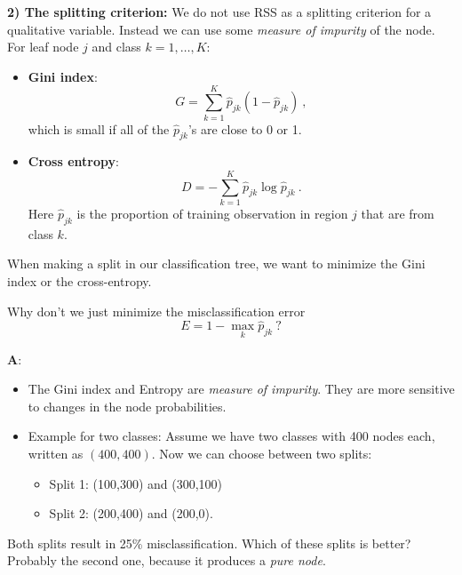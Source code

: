 \documentclass[10pt,ignorenonframetext,]{beamer}
\providecommand{\tightlist}{%
  \setlength{\itemsep}{0pt}\setlength{\parskip}{0pt}}
\begin{document}
\begin{frame}

\textbf{2) The splitting criterion:} We do not use RSS as a splitting
criterion for a qualitative variable. Instead we can use some
\emph{measure of impurity} of the node. For leaf node \(j\) and class
\(k=1,\ldots, K\):

\begin{itemize}
\tightlist
\item
  \textbf{Gini index}: \[
  G=\sum_{k=1}^K \hat{p}_{jk}(1-\hat{p}_{jk}) \ ,
  \] which is small if all of the \(\hat{p}_{jk}\)'s are close to 0 or
  1.
\end{itemize}

\vspace{1mm}

\begin{itemize}
\tightlist
\item
  \textbf{Cross entropy}: \[
  D=-\sum_{k=1}^K \hat{p}_{jk}\log\hat{p}_{jk} \ .
  \] Here \(\hat{p}_{jk}\) is the proportion of training observation in
  region \(j\) that are from class \(k\).
\end{itemize}

When making a split in our classification tree, we want to minimize the
Gini index or the cross-entropy.

\end{frame}

\begin{frame}

Why don't we just minimize the misclassification error
\[E= 1- \max_k{\hat{p}_{jk}} \ ?\]

\textbf{A}:

\begin{itemize}
\item
  The Gini index and Entropy are \emph{measure of impurity}. They are
  more sensitive to changes in the node probabilities.
\item
  Example for two classes: Assume we have two classes with 400 nodes
  each, written as \((400,400)\). Now we can choose between two splits:

  \begin{itemize}
  \tightlist
  \item
    Split 1: (100,300) and (300,100)\\
  \item
    Split 2: (200,400) and (200,0).
  \end{itemize}
\end{itemize}

Both splits result in 25\% misclassification. Which of these splits is
better? Probably the second one, because it produces a \emph{pure node}.

\end{frame}
\end{document}
